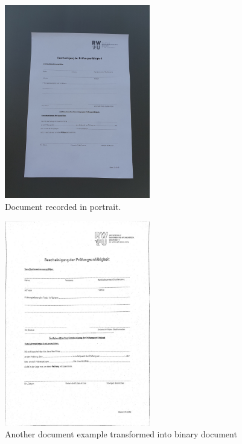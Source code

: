 \documentclass[twocolumn,10pt]{asme2ej}
\begin{document}
\begin{figure}[H]
    \centerline{\includegraphics[width=2.5in]{output/hoch_1_1_original.jpg}}
    \caption{Document recorded in portrait.}
    \label{fig:hoch1_original}
\end{figure}

\begin{figure}[H]
    \centerline{\includegraphics[width=2.5in]{output/hoch_1_8_adaptive_binary_image_mean.jpg}}
    \caption{Another document example transformed into binary document}
    \label{fig:hoch1_binary}
\end{figure}


% 



\end{document}
